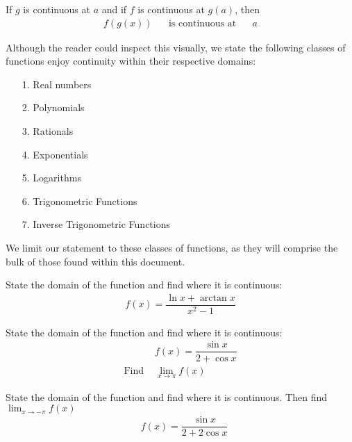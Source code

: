 \begin{theorem}
If $g$ is continuous at $a$ and if $f$ is continuous at $g(a)$, then
\begin{align*}
    f(g(x)) \hspace{20pt} \text{is continuous at} \hspace{20pt} a
\end{align*}
\label{continuity_passes_function}
\end{theorem}

\begin{note}
Although the reader could inspect this visually, we state the following classes of functions enjoy continuity within their respective domains:
\begin{itemize}
    \item [1.] Real numbers
    \item [2.] Polynomials
    \item [3.] Rationals
    \item [4.] Exponentials
    \item [5.] Logarithms 
    \item [6.] Trigonometric Functions
    \item [7.] Inverse Trigonometric Functions
\end{itemize}
We limit our statement to these classes of functions, as they will comprise the bulk of those found within this document. 
\end{note}

\begin{exercise}
State the domain of the function and find where it is continuous:
\begin{align*}
    f(x) = \dfrac{\ln x + \arctan x}{x^{2}-1}
\end{align*}
\end{exercise}

\begin{exercise}
State the domain of the function and find where it is continuous:
\begin{align*}
    &f(x) = \dfrac{\sin x}{2 + \cos x}\\
    \text{Find} \hspace{4pt} &\lim_{x \longrightarrow \pi} f(x)
\end{align*}
\end{exercise}

\begin{exercise}
State the domain of the function and find where it is continuous. Then find $\lim_{x \longrightarrow -\pi} f(x)$
\begin{align*}
    &f(x) = \dfrac{\sin x}{2 + 2\cos x}
\end{align*}
\end{exercise}

